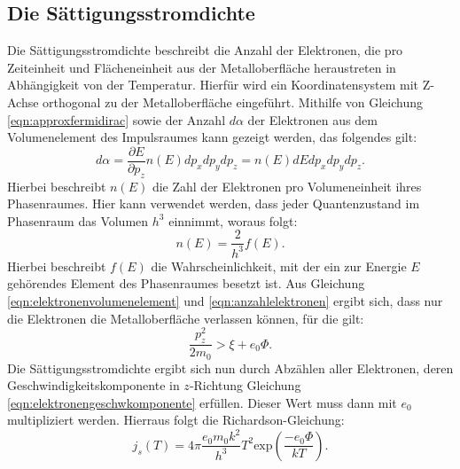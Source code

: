 \subsection{Die Sättigungsstromdichte}
\label{sec:sättstromd}
Die Sättigungsstromdichte beschreibt die Anzahl der Elektronen, die pro Zeiteinheit
und Flächeneinheit aus der Metalloberfläche heraustreten in Abhängigkeit von
der Temperatur. Hierfür wird ein Koordinatensystem mit Z-Achse orthogonal zu der
Metalloberfläche eingeführt. Mithilfe von Gleichung \eqref{eqn:approxfermidirac}
sowie der Anzahl $d\alpha$ der Elektronen aus dem Volumenelement des Impulsraumes
kann gezeigt werden, das folgendes gilt:
\begin{equation}
    d\alpha = \frac{\partial E}{\partial p_z} n(E) dp_x dp_y
    dp_z = n(E) dE dp_x dp_y dp_z.
    \label{eqn:elektronenvolumenelement}
\end{equation}
Hierbei beschreibt $n(E)$ die Zahl der Elektronen pro Volumeneinheit ihres
Phasenraumes. Hier kann verwendet werden, dass jeder Quantenzustand im Phasenraum
das Volumen $h^3$ einnimmt, woraus folgt:
\begin{equation}
    n(E) = \frac{2}{h^3}f(E).
    \label{eqn:anzahlelektronen}
\end{equation}
Hierbei beschreibt $f(E)$ die Wahrscheinlichkeit, mit der ein zur Energie $E$
gehörendes Element des Phasenraumes besetzt ist.
Aus Gleichung \eqref{eqn:elektronenvolumenelement} und \eqref{eqn:anzahlelektronen}
ergibt sich, dass nur die Elektronen die Metalloberfläche verlassen können, für
die gilt:
\begin{equation}
    \frac{p_z^2}{2 m_0} > \xi + e_0 \Phi.
    \label{eqn:elektronengeschwkomponente}
\end{equation}
Die Sättigungsstromdichte ergibt sich nun durch Abzählen aller Elektronen,
deren Geschwindigkeitskomponente in $z$-Richtung Gleichung
\eqref{eqn:elektronengeschwkomponente} erfüllen. Dieser Wert muss dann mit $e_0$
multipliziert werden. Hierraus folgt die Richardson-Gleichung:
\begin{equation}
    j_s(T) = 4 \pi \frac{e_0 m_0 k^2}{h^3}T^2 \text{exp}\left(\frac{-e_0 \Phi}{k T}\right).
    \label{eqn:richardson}
\end{equation}

